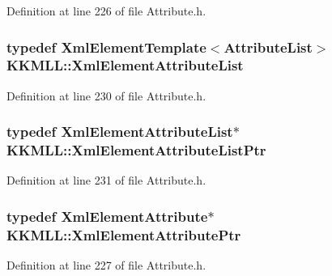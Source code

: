 Definition at line 226 of file Attribute.\+h.

\subsubsection[{\texorpdfstring{Xml\+Element\+Attribute\+List}{XmlElementAttributeList}}]{\setlength{\rightskip}{0pt plus 5cm}typedef {\bf Xml\+Element\+Template}$<${\bf Attribute\+List}$>$ {\bf K\+K\+M\+L\+L\+::\+Xml\+Element\+Attribute\+List}}\hypertarget{namespace_k_k_m_l_l_a63e2fcc786ad01bb56595ed647d0447f}{}\label{namespace_k_k_m_l_l_a63e2fcc786ad01bb56595ed647d0447f}


Definition at line 230 of file Attribute.\+h.

\subsubsection[{\texorpdfstring{Xml\+Element\+Attribute\+List\+Ptr}{XmlElementAttributeListPtr}}]{\setlength{\rightskip}{0pt plus 5cm}typedef {\bf Xml\+Element\+Attribute\+List}$\ast$ {\bf K\+K\+M\+L\+L\+::\+Xml\+Element\+Attribute\+List\+Ptr}}\hypertarget{namespace_k_k_m_l_l_abd419c888840e95517fce2c299041d18}{}\label{namespace_k_k_m_l_l_abd419c888840e95517fce2c299041d18}


Definition at line 231 of file Attribute.\+h.

\subsubsection[{\texorpdfstring{Xml\+Element\+Attribute\+Ptr}{XmlElementAttributePtr}}]{\setlength{\rightskip}{0pt plus 5cm}typedef {\bf Xml\+Element\+Attribute}$\ast$ {\bf K\+K\+M\+L\+L\+::\+Xml\+Element\+Attribute\+Ptr}}\hypertarget{namespace_k_k_m_l_l_ab7e5f3293606472391b48926f69ca5ab}{}\label{namespace_k_k_m_l_l_ab7e5f3293606472391b48926f69ca5ab}


Definition at line 227 of file Attribute.\+h.

